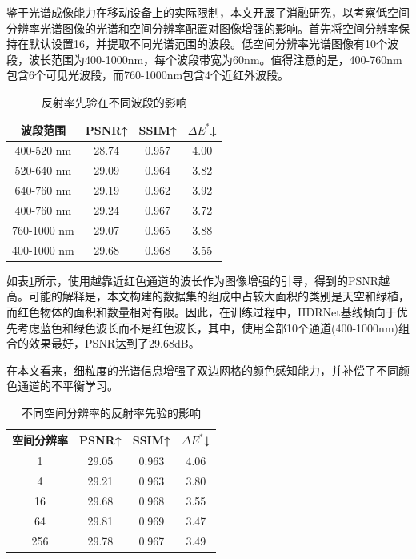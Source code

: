 \documentclass[
    type = master, %
    degree = academic,        %
    decl-page,  %
  ]{njuthesis}
\begin{document}
鉴于光谱成像能力在移动设备上的实际限制，本文开展了消融研究，以考察低空间分辨率光谱图像的光谱和空间分辨率配置对图像增强的影响。首先将空间分辨率保持在默认设置16，并提取不同光谱范围的波段。低空间分辨率光谱图像有10个波段，波长范围为400-1000nm，每个波段带宽为60nm。值得注意的是，400-760nm包含6个可见光波段，而760-1000nm包含4个近红外波段。
\begin{table}[h]
\centering                %
\caption{反射率先验在不同波段的影响}  %
\label{tab:j1b} 
\begin{tabular}{c|ccc}
\hline
波段范围            & PSNR↑ & SSIM↑ & $\Delta E^*$↓ \\ \hline
400-520 nm  & 28.74 & 0.957 & 4.00 \\
520-640 nm  & 29.09 & 0.964 & 3.82 \\
640-760 nm  & 29.19 & 0.962 & 3.92 \\
400-760 nm  & 29.24 & 0.967 & 3.72 \\
760-1000 nm & 29.07 & 0.965 & 3.88 \\
400-1000 nm & 29.68 & 0.968 & 3.55 \\ \hline
\end{tabular}
\end{table}
如表\ref{tab:j1b}所示，使用越靠近红色通道的波长作为图像增强的引导，得到的PSNR越高。可能的解释是，本文构建的数据集的组成中占较大面积的类别是天空和绿植，而红色物体的面积和数量相对有限。因此，在训练过程中，HDRNet基线倾向于优先考虑蓝色和绿色波长而不是红色波长，其中，使用全部10个通道(400-1000nm)组合的效果最好，PSNR达到了29.68dB。

在本文看来，细粒度的光谱信息增强了双边网格的颜色感知能力，并补偿了不同颜色通道的不平衡学习。

\begin{table}[h]
\centering                %
\caption{不同空间分辨率的反射率先验的影响}  %
\label{tab:j1c} 
\begin{tabular}{c|ccc}
\hline
空间分辨率                      & PSNR↑                     & SSIM↑                     & $\Delta E^*$↓                     \\ \hline
1\times1                         & 29.05                     & 0.963                     & 4.06                     \\
4\times4                         & 29.21                     & 0.963                     & 3.80                     \\
16\times16                       & 29.68                     & 0.968                     & 3.55                     \\
64\times64                       & 29.81                     & 0.969                     & 3.47                     \\ 
256\times256 & 29.78 & 0.967 & 3.49   \\  \hline
\end{tabular}
\end{table}
\end{document}
